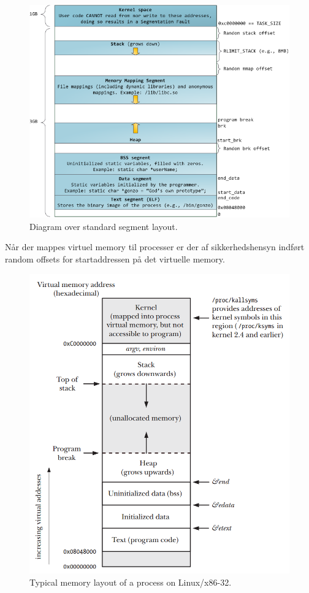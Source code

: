 \begin{figure}[H]
	\centering
	\includegraphics[width=\linewidth]{figs/spm1/memorydiagram}
	\caption{Diagram over standard segment layout.}
	\label{fig:memorydiagram}
\end{figure}

Når der mappes virtuel memory til processer er der af sikkerhedshensyn indført random offsets for startaddressen på det virtuelle memory.\\

\begin{figure}
	\centering
	\includegraphics[width=0.7\linewidth]{figs/spm1/virtualaddressspace}
	\caption{Typical memory layout of a process on Linux/x86-32.}
	\label{fig:virtualaddressspace}
\end{figure}


